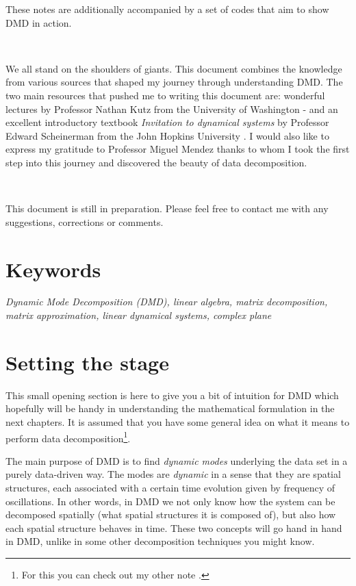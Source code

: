\documentclass[10pt,twocolumn]{article}
\begin{document}
These notes are additionally accompanied by a set of codes that aim to show DMD in action.

\,\,

We all stand on the shoulders of giants. This document combines the knowledge from various sources that shaped my journey through understanding DMD. The two main resources that pushed me to writing this document are: wonderful lectures by Professor Nathan Kutz from the University of Washington \cite{Prof_Nathan_Kutz_1}-\cite{Prof_Nathan_Kutz_2} and an excellent introductory textbook \textit{Invitation to dynamical systems} by Professor Edward Scheinerman from the John Hopkins University \cite{Prof_Edward_Scheinerman}. I would also like to express my gratitude to Professor Miguel Mendez thanks to whom I took the first step into this journey and discovered the beauty of data decomposition.

\,\,

This document is still in preparation. Please feel free to contact me with any suggestions, corrections or comments.

\section*{Keywords}

\textit{Dynamic Mode Decomposition (DMD), linear algebra, matrix decomposition, matrix approximation, linear dynamical systems, complex plane}



\tableofcontents


\section{Setting the stage}

This small opening section is here to give you a bit of intuition for DMD which hopefully will be handy in understanding the mathematical formulation in the next chapters. It is assumed that you have some general idea on what it means to perform data decomposition\footnote{For this you can check out my other note \cite{Zdybal_data_dec}.}.

The main purpose of DMD is to find \textit{dynamic modes} underlying the data set in a purely data-driven way. The modes are \textit{dynamic} in a sense that they are spatial structures, each associated with a certain time evolution given by frequency of oscillations. In other words, in DMD we not only know how the system can be decomposed spatially (what spatial structures it is composed of), but also how each spatial structure behaves in time. These two concepts will go hand in hand in DMD, unlike in some other decomposition techniques you might know.
\end{document}
